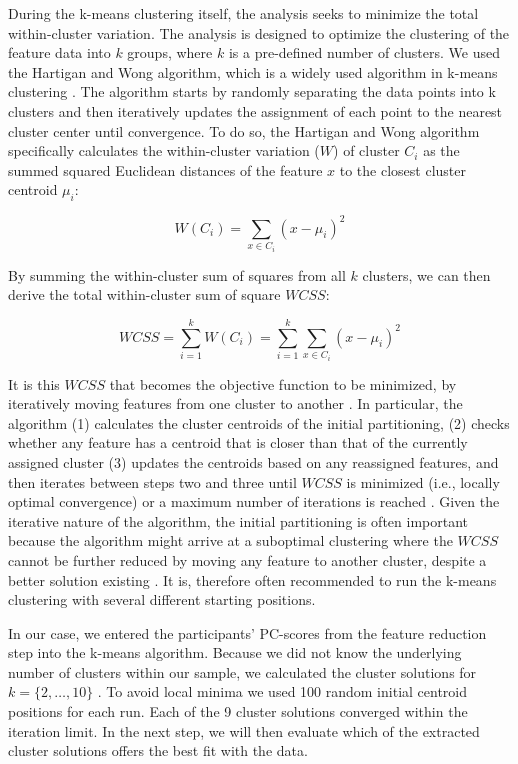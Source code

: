 \documentclass[man, 12pt, a4paper, floatsintext]{apa7}
\theoremstyle{break}
\theoremstyle{plain}
\begin{document}


During the k-means clustering itself, the analysis seeks to minimize the
total within-cluster variation. The analysis is designed to optimize the
clustering of the feature data into \(k\) groups, where \(k\) is a
pre-defined number of clusters. We used the Hartigan and Wong algorithm,
which is a widely used algorithm in k-means clustering
\citep{hartigan1979}. The algorithm starts by randomly separating the
data points into k clusters and then iteratively updates the assignment
of each point to the nearest cluster center until convergence. To do so,
the Hartigan and Wong algorithm specifically calculates the
within-cluster variation (\(W\)) of cluster \(C_i\) as the summed
squared Euclidean distances of the feature \(x\) to the closest cluster
centroid \(\mu_i\):

\begin{equation} \label{eq:kWCi}
  W(C_i) = \sum_{x \in C_i}(x-\mu_i)^2
\end{equation}

By summing the within-cluster sum of squares from all \(k\) clusters, we
can then derive the total within-cluster sum of square \(WCSS\):

\begin{equation} \label{eq:kWCSS}
  WCSS = \sum_{i=1}^k W(C_i) = \sum_{i=1}^k \sum_{x \in C_i} (x - \mu_i)^2
\end{equation}

It is this \(WCSS\) that becomes the objective function to be minimized,
by iteratively moving features from one cluster to another
\citep{hartigan1979}. In particular, the algorithm (1) calculates the
cluster centroids of the initial partitioning, (2) checks whether any
feature has a centroid that is closer than that of the currently
assigned cluster (3) updates the centroids based on any reassigned
features, and then iterates between steps two and three until \(WCSS\)
is minimized (i.e., locally optimal convergence) or a maximum number of
iterations is reached \citep{jain2010}. Given the iterative nature of
the algorithm, the initial partitioning is often important because the
algorithm might arrive at a suboptimal clustering where the \(WCSS\)
cannot be further reduced by moving any feature to another cluster,
despite a better solution existing
\citep[i.e., a local minimum;][]{timmerman2013}. It is, therefore often
recommended to run the k-means clustering with several different
starting positions.

In our case, we entered the participants' PC-scores from the feature
reduction step into the k-means algorithm. Because we did not know the
underlying number of clusters within our sample, we calculated the
cluster solutions for \(k=\{2, \dots , 10\}\) . To avoid local minima we
used 100 random initial centroid positions for each run. Each of the 9
cluster solutions converged within the iteration limit. In the next
step, we will then evaluate which of the extracted cluster solutions
offers the best fit with the data.
\end{document}
